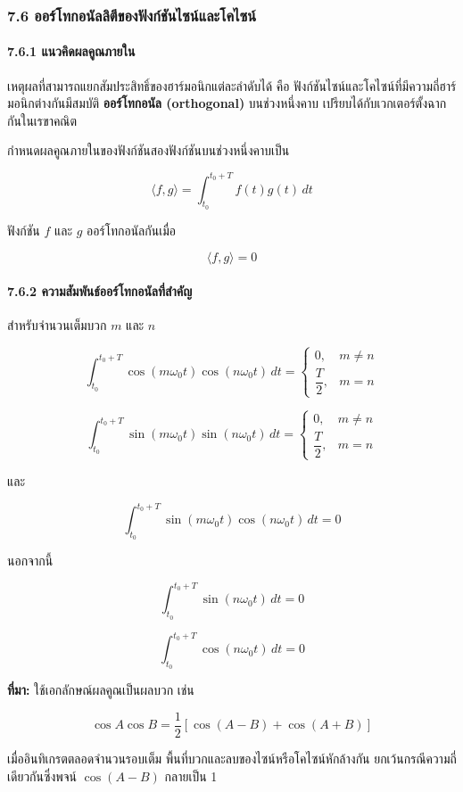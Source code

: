 \subsubsection{7.6 ออร์โทกอนัลลิตีของฟังก์ชันไซน์และโคไซน์}

\paragraph{7.6.1 แนวคิดผลคูณภายใน}

เหตุผลที่สามารถแยกสัมประสิทธิ์ของฮาร์มอนิกแต่ละลำดับได้ คือ ฟังก์ชันไซน์และโคไซน์ที่มีความถี่ฮาร์มอนิกต่างกันมีสมบัติ \textbf{ออร์โทกอนัล (orthogonal)} บนช่วงหนึ่งคาบ เปรียบได้กับเวกเตอร์ตั้งฉากกันในเรขาคณิต

กำหนดผลคูณภายในของฟังก์ชันสองฟังก์ชันบนช่วงหนึ่งคาบเป็น

\[
\langle f,g\rangle=\int_{t_0}^{t_0+T}f(t)g(t)\,dt
\]

ฟังก์ชัน \(f\) และ \(g\) ออร์โทกอนัลกันเมื่อ

\[
\langle f,g\rangle=0
\]

\paragraph{7.6.2 ความสัมพันธ์ออร์โทกอนัลที่สำคัญ}

สำหรับจำนวนเต็มบวก \(m\) และ \(n\)

\[
\int_{t_0}^{t_0+T}\cos(m\omega_0t)\cos(n\omega_0t)\,dt=
\begin{cases}
0, & m\ne n\\
\dfrac{T}{2}, & m=n
\end{cases}
\]

\[
\int_{t_0}^{t_0+T}\sin(m\omega_0t)\sin(n\omega_0t)\,dt=
\begin{cases}
0, & m\ne n\\
\dfrac{T}{2}, & m=n
\end{cases}
\]

และ

\[
\int_{t_0}^{t_0+T}\sin(m\omega_0t)\cos(n\omega_0t)\,dt=0
\]

นอกจากนี้

\[
\int_{t_0}^{t_0+T}\sin(n\omega_0t)\,dt=0
\]

\[
\int_{t_0}^{t_0+T}\cos(n\omega_0t)\,dt=0
\]

\textbf{ที่มา:} ใช้เอกลักษณ์ผลคูณเป็นผลบวก เช่น

\[
\cos A\cos B=\frac{1}{2}\left[\cos(A-B)+\cos(A+B)\right]
\]

เมื่ออินทิเกรตตลอดจำนวนรอบเต็ม พื้นที่บวกและลบของไซน์หรือโคไซน์หักล้างกัน ยกเว้นกรณีความถี่เดียวกันซึ่งพจน์ \(\cos(A-B)\) กลายเป็น 1

